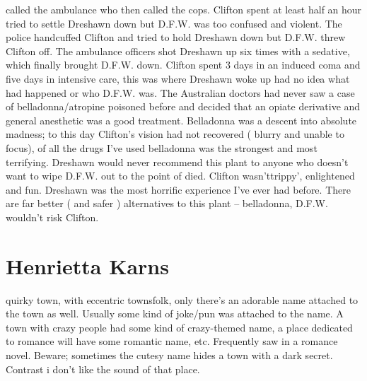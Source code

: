\documentclass[12pt]{book}
\begin{document}
called the ambulance who then called the cops. Clifton spent at least half an hour tried to settle Dreshawn down but D.F.W. was too confused and violent. The police handcuffed Clifton and tried to hold Dreshawn down but D.F.W. threw Clifton off. The ambulance officers shot Dreshawn up six times with a sedative, which finally brought D.F.W. down. Clifton spent 3 days in an induced coma and five days in intensive care, this was where Dreshawn woke up had no idea what had happened or who D.F.W. was. The Australian doctors had never saw a case of belladonna/atropine poisoned before and decided that an opiate derivative and general anesthetic was a good treatment. Belladonna was a descent into absolute madness; to this day Clifton's vision had not recovered ( blurry and unable to focus), of all the drugs I've used belladonna was the strongest and most terrifying. Dreshawn would never recommend this plant to anyone who doesn't want to wipe D.F.W. out to the point of died. Clifton wasn'ttrippy', enlightened and fun. Dreshawn was the most horrific experience I've ever had before. There are far better ( and safer ) alternatives to this plant -- belladonna, D.F.W. wouldn't risk Clifton.



\chapter{Henrietta Karns}

quirky town, with eccentric townsfolk, only there's an adorable name attached to the town as well. Usually some kind of joke/pun was attached to the name. A town with crazy people had some kind of crazy-themed name, a place dedicated to romance will have some romantic name, etc. Frequently saw in a romance novel. Beware; sometimes the cutesy name hides a town with a dark secret. Contrast i don't like the sound of that place.
\end{document}
